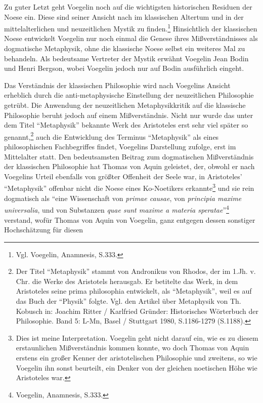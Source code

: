Zu guter Letzt geht Voegelin noch auf die wichtigsten historischen Residuen
der Noese ein. Diese sind seiner Ansicht nach im klassischen Altertum und in
der mittelalterlichen und neuzeitlichen Mystik zu finden.\footnote{Vgl.
  Voegelin, Anamnesis, S.333.} Hinsichtlich der klassischen Noese entwickelt
Voegelin nur noch einmal die Genese ihres Mißverständnisses als dogmatische
Metaphysik, ohne die klassische Noese selbst ein weiteres Mal zu behandeln.
Als bedeutsame Vertreter der Mystik erwähnt Voegelin Jean Bodin und Henri
Bergson, wobei Voegelin jedoch nur auf Bodin ausführlich eingeht.

Das Verständnis der klassischen Philosophie wird nach Voegelins Ansicht
erheblich durch die anti-metaphysische Einstellung der neuzeitlichen
Philosophie getrübt. Die Anwendung der neuzeitlichen Metaphysikkritik
auf die klassische Philosophie beruht jedoch auf einem Mißverständnis.
Nicht nur wurde das unter dem Titel "`Metaphysik"' bekannte Werk des
Aristoteles erst sehr viel später so genannt,\footnote{Der Titel
  "`Metaphysik"' stammt von Andronikus von Rhodos, der im 1.Jh. v. Chr.
  die Werke des Aristotels herausgab. Er betitelte das Werk, in dem
  Aristoteles seine prima philosophia entwickelt, als "`Metaphysik"',
  weil es auf das Buch der "`Physik"' folgte.  Vgl. den Artikel über
  Metaphysik von Th. Kobusch in: Joachim Ritter / Karlfried Gründer:
  Historisches Wörterbuch der Philosophie. Band 5: L-Mn, Basel /
  Stuttgart 1980, S.1186-1279 (S.1188).}  auch die Entwicklung des
Terminus "`Metaphysik"' als eines philosophischen Fachbegriffes findet,
Voegelins Darstellung zufolge, erst im Mittelalter statt. Den
bedeutsamsten Beitrag zum dogmatischen Mißverständnis der klassischen
Philosophie hat Thomas von Aquin geleistet, der, obwohl er nach
Voegelins Urteil ebenfalls von größter Offenheit der Seele war, in
Aristoteles' "`Metaphysik"' offenbar nicht die Noese eines Ko-Noetikers
erkannte\footnote{Dies ist meine Interpretation.  Voegelin geht nicht
  darauf ein, wie es zu diesem erstaunlichen Mißverständnis kommen
  konnte, wo doch Thomas von Aquin erstens ein großer Kenner der
  aristotelischen Philosophie und zweitens, so wie Voegelin ihn sonst
  beurteilt, ein Denker von der gleichen noetischen Höhe wie Aristoteles
  war.} und sie rein dogmatisch als "`eine Wissenschaft von {\it primae
  causae}, von {\it principia maxime universalia}, und von Substanzen
{\it quae sunt maxime a materia speratae}"'\footnote{Voegelin,
  Anamnesis, S.333.} verstand, wofür Thomas von Aquin von Voegelin,
ganz entgegen dessen sonstiger Hochschätzung für diesen
